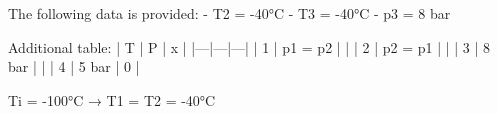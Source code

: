 The following data is provided:  
- T2 = -40°C  
- T3 = -40°C  
- p3 = 8 bar  

Additional table:  
| T | P | x |  
|---|---|---|  
| 1 | p1 = p2 |   |  
| 2 | p2 = p1 |   |  
| 3 | 8 bar |   |  
| 4 | 5 bar | 0 |  

Ti = -100°C → T1 = T2 = -40°C